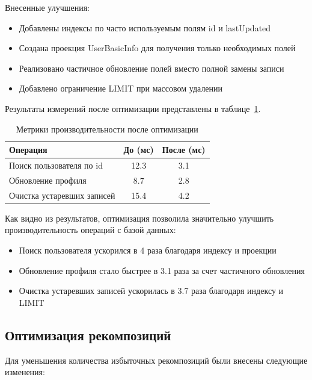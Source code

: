 \documentclass[14pt, russian]{scrartcl}
\begin{document}
Внесенные улучшения:
\begin{itemize}
\item Добавлены индексы по часто используемым полям id и lastUpdated
\item Создана проекция UserBasicInfo для получения только необходимых полей
\item Реализовано частичное обновление полей вместо полной замены записи
\item Добавлено ограничение LIMIT при массовом удалении
\end{itemize}

Результаты измерений после оптимизации представлены в таблице~\ref{tab:db-metrics-after}.

\begin{table}[!htb]
\caption{Метрики производительности после оптимизации}
\vspace{-0.3cm}
\label{tab:db-metrics-after}
\begin{center}
\begin{tabular}{|l|c|c|}
\hline
\textbf{Операция} & \textbf{До (мс)} & \textbf{После (мс)} \\
\hline
Поиск пользователя по id & 12.3 & 3.1 \\
\hline
Обновление профиля & 8.7 & 2.8 \\
\hline
Очистка устаревших записей & 15.4 & 4.2 \\
\hline
\end{tabular}
\end{center}
\end{table}

Как видно из результатов, оптимизация позволила значительно улучшить производительность операций с базой данных:
\begin{itemize}
\item Поиск пользователя ускорился в 4 раза благодаря индексу и проекции
\item Обновление профиля стало быстрее в 3.1 раза за счет частичного обновления
\item Очистка устаревших записей ускорилась в 3.7 раза благодаря индексу и LIMIT
\end{itemize} 

\subsection{Оптимизация рекомпозиций}\label{sect:recomposition-optimization}

Для уменьшения количества избыточных рекомпозиций были внесены следующие изменения:
\end{document}
